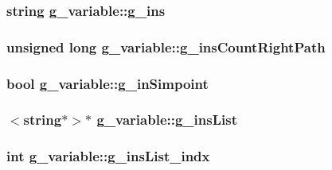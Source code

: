 \label{structg__variable_a9ab79f56074bb46d6ae7d797c52442f3}
\hypertarget{structg__variable_aa7824f9bbc1a8ff7548bcf42922c0c2b}{
\subsubsection[{g\_\-ins}]{\setlength{\rightskip}{0pt plus 5cm}string {\bf g\_\-variable::g\_\-ins}}}
\label{structg__variable_aa7824f9bbc1a8ff7548bcf42922c0c2b}
\hypertarget{structg__variable_a9849ae320434c4f9d060f131e24509fd}{
\subsubsection[{g\_\-insCountRightPath}]{\setlength{\rightskip}{0pt plus 5cm}unsigned long {\bf g\_\-variable::g\_\-insCountRightPath}}}
\label{structg__variable_a9849ae320434c4f9d060f131e24509fd}
\hypertarget{structg__variable_a1bfe24cfc139671202d50d3617bc3095}{
\subsubsection[{g\_\-inSimpoint}]{\setlength{\rightskip}{0pt plus 5cm}bool {\bf g\_\-variable::g\_\-inSimpoint}}}
\label{structg__variable_a1bfe24cfc139671202d50d3617bc3095}
\hypertarget{structg__variable_a527a8f416e63493c83e0f6e50a6bdc79}{
\subsubsection[{g\_\-insList}]{$<$string$\ast$$>$$\ast$ {\bf g\_\-variable::g\_\-insList}}}
\label{structg__variable_a527a8f416e63493c83e0f6e50a6bdc79}
\hypertarget{structg__variable_aabbfa0530ffffdecf990fb2d64998f4e}{
\subsubsection[{g\_\-insList\_\-indx}]{\setlength{\rightskip}{0pt plus 5cm}int {\bf g\_\-variable::g\_\-insList\_\-indx}}}
